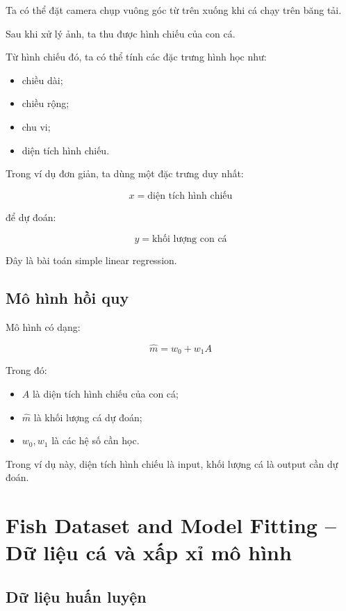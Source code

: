 Ta có thể đặt camera chụp vuông góc từ trên xuống khi cá chạy trên băng tải.

Sau khi xử lý ảnh, ta thu được hình chiếu của con cá.

Từ hình chiếu đó, ta có thể tính các đặc trưng hình học như:

\begin{itemize}
    \item chiều dài;
    \item chiều rộng;
    \item chu vi;
    \item diện tích hình chiếu.
\end{itemize}

Trong ví dụ đơn giản, ta dùng một đặc trưng duy nhất:

\[
    x = \text{diện tích hình chiếu}
\]

để dự đoán:

\[
    y = \text{khối lượng con cá}
\]

Đây là bài toán simple linear regression.

\subsection{Mô hình hồi quy}

Mô hình có dạng:

\[
    \hat{m}=w_0+w_1A
\]

Trong đó:

\begin{itemize}
    \item $A$ là diện tích hình chiếu của con cá;
    \item $\hat{m}$ là khối lượng cá dự đoán;
    \item $w_0,w_1$ là các hệ số cần học.
\end{itemize}

\begin{ghinho}
Trong ví dụ này, diện tích hình chiếu là input, khối lượng cá là output cần dự đoán.
\end{ghinho}

\section{Fish Dataset and Model Fitting -- Dữ liệu cá và xấp xỉ mô hình}

\subsection{Dữ liệu huấn luyện}

